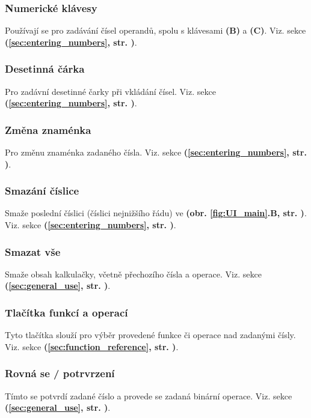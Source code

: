 \documentclass[a5paper,8pt,twoside]{extarticle}
\newcommand*\nref[1]{\textbf{(\ref{#1}, str. \pageref{#1})}}
\newcommand*\fref[2]{\textbf{(obr. \ref{#1}#2, str. \pageref{#1})}}
\begin{document}
    \subsubsection{Numerické klávesy}
    Používají se pro zadávání čísel operandů, spolu s klávesami  \textbf{(B)} a  \textbf{(C)}. Viz. sekce  \nref{sec:entering_numbers}.

    \subsubsection{Desetinná čárka}
    Pro zadávní desetinné čarky při vkládání čísel. Viz. sekce  \nref{sec:entering_numbers}.

    \subsubsection{Změna znaménka}
    Pro změnu znaménka zadaného čísla. Viz. sekce  \nref{sec:entering_numbers}.

    \subsubsection{Smazání číslice}
    Smaže poslední číslici (číslici nejnižšího řádu) ve  \fref{fig:UI_main}{.B}. Viz. sekce  \nref{sec:entering_numbers}.

    \subsubsection{Smazat vše}
    Smaže obsah kalkulačky, včetně přechozího čísla a operace. Viz. sekce  \nref{sec:general_use}.

    \subsubsection{Tlačítka funkcí a operací}
    Tyto tlačítka slouží pro výběr provedené funkce či operace nad zadanými čísly. Viz. sekce  \nref{sec:function_reference}.

    \subsubsection{Rovná se / potrvrzení}
    Tímto se potvrdí zadané číslo a provede se zadaná binární operace. Viz. sekce  \nref{sec:general_use}.
\end{document}
